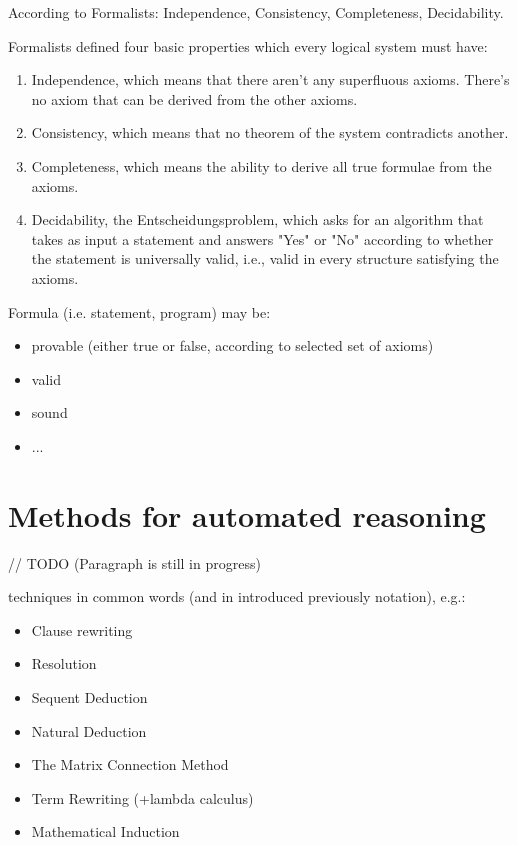 \documentclass[article]{aaltoseries}
\begin{document}
According to Formalists: Independence, Consistency, Completeness, Decidability.

Formalists defined four basic properties which every logical system must have:
\begin{enumerate}
\itemsep0em
	\item Independence, which means that there aren’t any superfluous axioms. There’s no axiom that can be derived from the other axioms.
	\item Consistency, which means that no theorem of the system contradicts another.
	\item Completeness, which means the ability to derive all true formulae from the axioms.
	\item Decidability, the Entscheidungsproblem, which asks for an algorithm that takes as input a statement and answers "Yes" or "No" according to whether the statement is universally valid, i.e., valid in every structure satisfying the axioms.
\end{enumerate}

Formula (i.e. statement, program) may be:
\begin{itemize}
\itemsep0em
	\item provable (either true or false, according to selected set of axioms)
	\item valid
	\item sound
	\item ...
\end{itemize}


\section{Methods for automated reasoning}
\label{sec:auto_reasoning}

// TODO (Paragraph is still in progress)

techniques in common words (and in introduced previously notation), e.g.: 
\begin{itemize}
\itemsep0em
	\item Clause rewriting
	\item Resolution
	\item Sequent Deduction
	\item Natural Deduction
	\item The Matrix Connection Method
	\item Term Rewriting (+lambda calculus)
	\item Mathematical Induction
\end{itemize}
\end{document}
